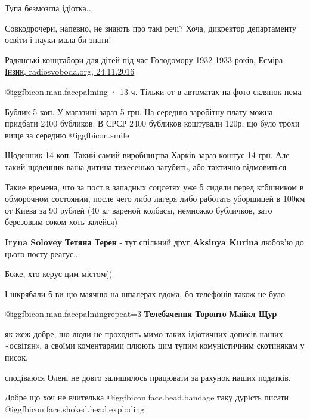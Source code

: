\begin{itemize}
Тупа безмозгла ідіотка...


Совкодрочери, напевно, не знають про такі речі? Хоча, дикректор департаменту
освіти і науки мала би знати! 

\href{https://www.radiosvoboda.org/a/28137445.html}{%
Радянські концтабори для дітей під час Голодомору 1932-1933 років, Есміра Інзик, radiosvoboda.org, 24.11.2016%
}

 @igg{fbicon.man.facepalming} 
 · 13 ч.
Тільки от в автоматах на фото склянок нема


Бублик 5 коп. У магазині зараз 5 грн. На середню заробітну плату можна придбати
2400 бубликов. В СРСР 2400 бубликов коштували 120р, що було трохи вище за
середню  @igg{fbicon.smile} 

Щоденник 14 коп. Такий самий виробництва Харків зараз коштує 14 грн. Але такий
щоденник ваша дитина тихесенько загубить, або тактично відмовиться


Такие времена, что за пост в западных соцсетях уже б сидели перед кгбшником в
обморочном состоянии, после чего либо лагеря либо работать уборщицей в 100км от
Киева за 90 рублей (40 кг вареной колбасы, немножко бубличков, зато березовым
соком хоть залейся)

\textbf{Iryna Solovey} \textbf{Тетяна Терен} - тут спільний друг \textbf{Aksinya Kurina} любов'ю до цього посту реагує...


Боже, хто керує цим містом((

І шкрябали б ви цю маячню на шпалерах вдома, бо телефонів також не було

 @igg{fbicon.man.facepalming}{repeat=3} 
\textbf{Телебачення Торонто}
\textbf{Майкл Щур}


як жеж добре, шо люди не проходять мимо таких ідіотичних дописів наших
«освітян», а своїми коментарями плюють цим тупим комуністичним скотинякам у
писок.

сподіваюся Олені не довго залишилось працювати за рахунок наших податків.

Добре що хоч не вчителька @igg{fbicon.face.head.bandage}  таку дурість писати  @igg{fbicon.face.shoked.head.exploding} 



\end{itemize}
